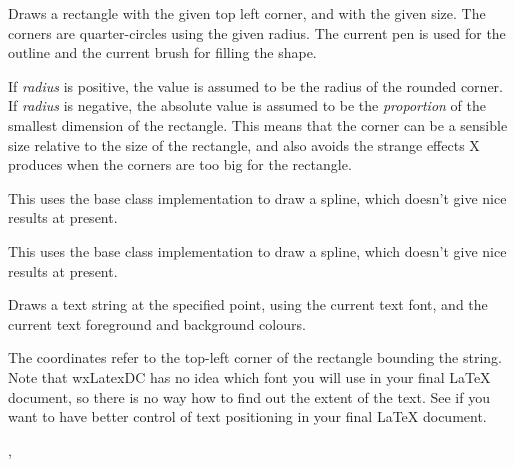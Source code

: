 Draws a rectangle with the given top left corner, and with the given
size.  The corners are quarter-circles using the given radius. The
current pen is used for the outline and the current brush for filling
the shape.

If {\it radius} is positive, the value is assumed to be the
radius of the rounded corner. If {\it radius} is negative,
the absolute value is assumed to be the {\it proportion} of the smallest
dimension of the rectangle. This means that the corner can be
a sensible size relative to the size of the rectangle, and also avoids
the strange effects X produces when the corners are too big for
the rectangle.

\label{wxlatexdcdrawspline}



This uses the base class implementation to draw a spline, which
doesn't give nice results at present. 


This uses the base class implementation to draw a spline, which
doesn't give nice results at present. 

\label{wxlatexdcdrawtext}


Draws a text string at the specified point, using the current text font,
and the current text foreground and background colours.

The coordinates refer to the top-left corner of the rectangle bounding
the string. Note that wxLatexDC has no idea which font you will use in
your final LaTeX document, so there is no way how to find out the extent
of the text. See 
if you want to have better control of text positioning in your final LaTeX document.


, 

